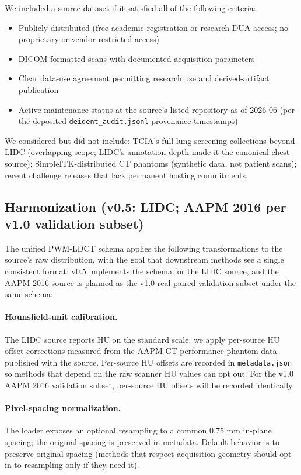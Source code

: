 \documentclass[twoside,11pt]{article}
\begin{document}
We included a source dataset if it satisfied all of the following criteria:

\begin{itemize}
    \item Publicly distributed (free academic registration or research-DUA access; no proprietary or vendor-restricted access)
    \item DICOM-formatted scans with documented acquisition parameters
    \item Clear data-use agreement permitting research use and derived-artifact publication
    \item Active maintenance status at the source's listed repository as of 2026-06 (per the deposited \texttt{deident\_audit.jsonl} provenance timestamps)
\end{itemize}

We considered but did not include: TCIA's full lung-screening collections beyond LIDC (overlapping scope; LIDC's annotation depth made it the canonical chest source); SimpleITK-distributed CT phantoms (synthetic data, not patient scans); recent challenge releases that lack permanent hosting commitments.

\subsection*{Harmonization (v0.5: LIDC; AAPM 2016 per v1.0 validation subset)}

The unified PWM-LDCT schema applies the following transformations to the source's raw distribution, with the goal that downstream methods see a single consistent format; v0.5 implements the schema for the LIDC source, and the AAPM 2016 source is planned as the v1.0 real-paired validation subset under the same schema:

\paragraph{Hounsfield-unit calibration.} The LIDC source reports HU on the standard scale; we apply per-source HU offset corrections measured from the AAPM CT performance phantom data published with the source. Per-source HU offsets are recorded in \texttt{metadata.json} so methods that depend on the raw scanner HU values can opt out. For the v1.0 AAPM 2016 validation subset, per-source HU offsets will be recorded identically.

\paragraph{Pixel-spacing normalization.} The loader exposes an optional resampling to a common 0.75 mm in-plane spacing; the original spacing is preserved in metadata. Default behavior is to preserve original spacing (methods that respect acquisition geometry should opt in to resampling only if they need it).
\end{document}

